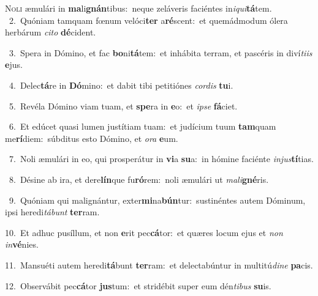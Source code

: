 \lettrine{\initial\textcolor{\initialcolor}{N}}{oli} æmulári in \textbf{ma}\-li\-\textbf{gnán}\-tibus:~\star neque zeláveris faciéntes in\-\textit{i}\-\textit{qui}\textbf{tá}tem.\\
{\numbfont\textcolor{\numbcolor}{~2.}}~Quóniam tamquam fœnum velóci\textbf{ter} a\-\textbf{ré}\-scent:~\star et quemádmodum ólera herbárum \textit{ci}\-\textit{to} \textbf{dé}\-cident.\par
{\numbfont\textcolor{\numbcolor}{~3.}}~Spera in Dómino, et fac \textbf{bo}\-ni\-\textbf{tá}\-tem:~\star et inhábita terram, et pascéris in diví\-\textit{ti}\-\textit{is} \textbf{e}\-jus.\par
{\numbfont\textcolor{\numbcolor}{~4.}}~Delec\-\textbf{tá}\-re in \textbf{Dó}\-mino:~\star et dabit tibi petitiónes \textit{cor}\-\textit{dis} \textbf{tu}\-i.\par
{\numbfont\textcolor{\numbcolor}{~5.}}~Revéla Dómino viam tuam, et \textbf{spe}\-ra in \textbf{e}\-o:~\star et \textit{ip}\-\textit{se} \textbf{fá}\-ciet.\par
{\numbfont\textcolor{\numbcolor}{~6.}}~Et edúcet quasi lumen justítiam tuam:~\dagger et judícium tuum \textbf{tam}\-quam me\-\textbf{rí}\-diem:~\star súbditus esto Dómino, et \textit{o}\-\textit{ra} \textbf{e}\-um.\par
{\numbfont\textcolor{\numbcolor}{~7.}}~Noli æmulári in eo, qui prosperátur in \textbf{vi}\-a \textbf{su}\-a:~\star in hómine faciénte \textit{in}\-\textit{jus}\textbf{tí}tias.\par
{\numbfont\textcolor{\numbcolor}{~8.}}~Désine ab ira, et dere\-\textbf{lín}\-que fu\-\textbf{ró}\-rem:~\star noli æmulári ut \textit{ma}\-\textit{li}\textbf{gné}ris.\par
{\numbfont\textcolor{\numbcolor}{~9.}}~Quóniam qui malignántur, exter\-\textbf{mi}\-na\-\textbf{bún}\-tur:~\star sustinéntes autem Dóminum, ipsi heredi\-\textit{tá}\-\textit{bunt} \textbf{ter}\-ram.\par
{\numbfont\textcolor{\numbcolor}{10.}}~Et adhuc pusíllum, et non \textbf{e}\-rit pec\-\textbf{cá}\-tor:~\star et quæres locum ejus et \textit{non} \textit{in}\-\textbf{vé}nies.\par
{\numbfont\textcolor{\numbcolor}{11.}}~Mansuéti autem heredi\-\textbf{tá}\-bunt \textbf{ter}\-ram:~\star et delectabúntur in multitú\-\textit{di}\-\textit{ne} \textbf{pa}\-cis.\par
{\numbfont\textcolor{\numbcolor}{12.}}~Observábit pec\-\textbf{cá}\-tor \textbf{jus}\-tum:~\star et stridébit super eum dén\-\textit{ti}\-\textit{bus} \textbf{su}\-is.\par
